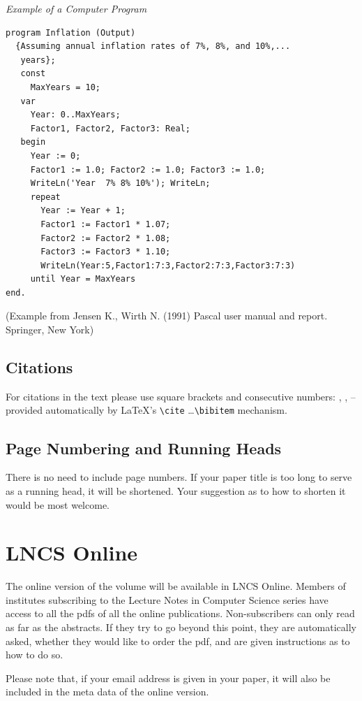 \documentclass{book}
\begin{document}
\medskip

\noindent
{\it Example of a Computer Program}
\begin{verbatim}
program Inflation (Output)
  {Assuming annual inflation rates of 7%, 8%, and 10%,...
   years};
   const
     MaxYears = 10;
   var
     Year: 0..MaxYears;
     Factor1, Factor2, Factor3: Real;
   begin
     Year := 0;
     Factor1 := 1.0; Factor2 := 1.0; Factor3 := 1.0;
     WriteLn('Year  7% 8% 10%'); WriteLn;
     repeat
       Year := Year + 1;
       Factor1 := Factor1 * 1.07;
       Factor2 := Factor2 * 1.08;
       Factor3 := Factor3 * 1.10;
       WriteLn(Year:5,Factor1:7:3,Factor2:7:3,Factor3:7:3)
     until Year = MaxYears
end.
\end{verbatim}
%
\noindent
{\small (Example from Jensen K., Wirth N. (1991) Pascal user manual and
report. Springer, New York)}

\subsection{Citations}

For citations in the text please use
square brackets and consecutive numbers: \cite{jour}, \cite{lncschap},
\cite{proceeding1} -- provided automatically
by \LaTeX 's \verb|\cite| \dots\verb|\bibitem| mechanism.

\subsection{Page Numbering and Running Heads}

There is no need to include page numbers. If your paper title is too
long to serve as a running head, it will be shortened. Your suggestion
as to how to shorten it would be most welcome.

\section{LNCS Online}

The online version of the volume will be available in LNCS Online.
Members of institutes subscribing to the Lecture Notes in Computer
Science series have access to all the pdfs of all the online
publications. Non-subscribers can only read as far as the abstracts. If
they try to go beyond this point, they are automatically asked, whether
they would like to order the pdf, and are given instructions as to how
to do so.

Please note that, if your email address is given in your paper,
it will also be included in the meta data of the online version.
\end{document}
